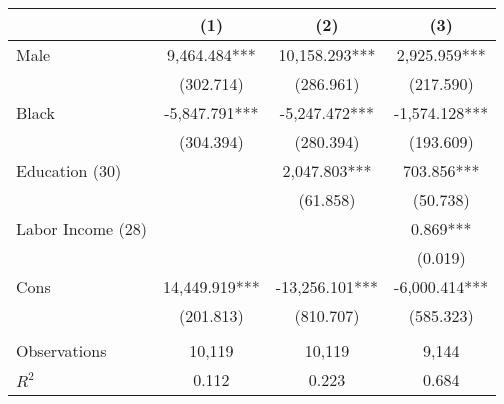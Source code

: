 \begin{tabular}{lccc} \toprule
 & (1) & (2) & (3) \\ \midrule
Male & 9,464.484*** & 10,158.293*** & 2,925.959*** \\
 & (302.714) & (286.961) & (217.590) \\
Black & -5,847.791*** & -5,247.472*** & -1,574.128*** \\
 & (304.394) & (280.394) & (193.609) \\
Education (30) &  & 2,047.803*** & 703.856*** \\
 &  & (61.858) & (50.738) \\
Labor Income (28) &  &  & 0.869*** \\
 &  &  & (0.019) \\
Cons & 14,449.919*** & -13,256.101*** & -6,000.414*** \\
 & (201.813) & (810.707) & (585.323) \\
 &  &  &  \\
Observations & 10,119 & 10,119 & 9,144 \\
$R^2$ & 0.112 & 0.223 & 0.684 \\ \bottomrule
\end{tabular}

